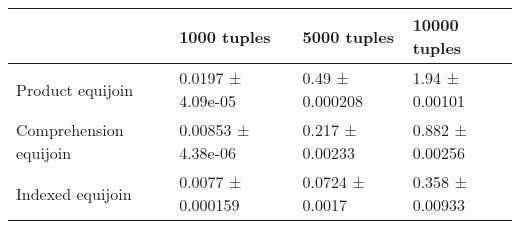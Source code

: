 \begin{tabular}{llll}
\toprule
 & 1000 tuples & 5000 tuples & 10000 tuples \\
\midrule
Product equijoin & 0.0197 ± 4.09e-05 & 0.49 ± 0.000208 & 1.94 ± 0.00101 \\
Comprehension equijoin & 0.00853 ± 4.38e-06 & 0.217 ± 0.00233 & 0.882 ± 0.00256 \\
Indexed equijoin & 0.0077 ± 0.000159 & 0.0724 ± 0.0017 & 0.358 ± 0.00933 \\
\bottomrule
\end{tabular}
